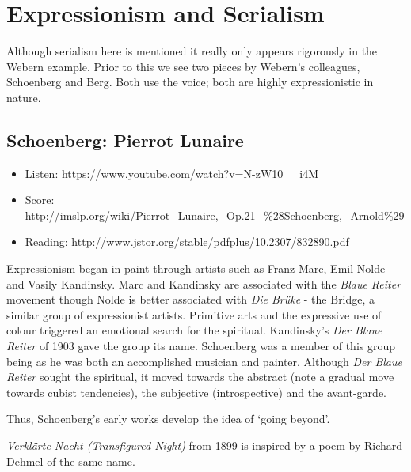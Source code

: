 
\chapter{Expressionism and Serialism}
\label{twentieth}

Although serialism here is mentioned it really only appears rigorously in the Webern example. 
Prior to this we see two pieces by Webern's colleagues, Schoenberg and Berg.
Both use the voice; both are highly expressionistic in nature. 


\section{Schoenberg: Pierrot Lunaire}
\begin{itemize}
\item Listen: \url{https://www.youtube.com/watch?v=N-zW10__i4M}
\item Score: \url{http://imslp.org/wiki/Pierrot_Lunaire,_Op.21_%28Schoenberg,_Arnold%29}
\item Reading: \url{http://www.jstor.org/stable/pdfplus/10.2307/832890.pdf}
\end{itemize}

Expressionism began in paint through artists such as Franz Marc, Emil Nolde and Vasily Kandinsky. Marc and Kandinsky are associated with the \textit{Blaue Reiter} movement though Nolde is better associated with \textit{Die Br\"uke} - the Bridge, a similar group of expressionist artists. Primitive arts and the expressive use of colour triggered an emotional search for the spiritual. Kandinsky's \textit{Der Blaue Reiter} of 1903 gave the group its name. Schoenberg was a member of this group being as he was both an accomplished musician and painter. Although \textit{Der Blaue Reiter} sought the spiritual, it moved towards the abstract (note a gradual move towards cubist tendencies), the subjective (introspective) and the avant-garde. 

Thus, Schoenberg's early works develop the idea of `going beyond'. 

\textit{Verkl\"arte Nacht (Transfigured Night)} from 1899 is inspired by a poem by Richard Dehmel of the same name. 

